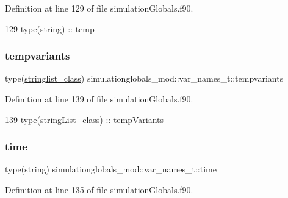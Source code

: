 Definition at line 129 of file simulation\+Globals.\+f90.


\begin{DoxyCode}
129         \textcolor{keywordtype}{type}(string) :: temp
\end{DoxyCode}
\mbox{\label{structsimulationglobals__mod_1_1var__names__t_ac8683baed9dc7b78e48128ebc1df9fe3}} 
\subsubsection{\texorpdfstring{tempvariants}{tempvariants}}
{\footnotesize\ttfamily type(\mbox{\hyperlink{structsimulationglobals__mod_1_1stringlist__class}{stringlist\+\_\+class}}) simulationglobals\+\_\+mod\+::var\+\_\+names\+\_\+t\+::tempvariants\hspace{0.3cm}{\ttfamily [private]}}



Definition at line 139 of file simulation\+Globals.\+f90.


\begin{DoxyCode}
139         \textcolor{keywordtype}{type}(stringList\_class) :: tempVariants
\end{DoxyCode}
\mbox{\label{structsimulationglobals__mod_1_1var__names__t_a3826ddc89095f68c7ff6ee007adaaa45}} 
\subsubsection{\texorpdfstring{time}{time}}
{\footnotesize\ttfamily type(string) simulationglobals\+\_\+mod\+::var\+\_\+names\+\_\+t\+::time\hspace{0.3cm}{\ttfamily [private]}}



Definition at line 135 of file simulation\+Globals.\+f90.


